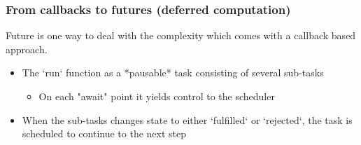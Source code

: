 \begin{frame}[fragile]
    \frametitle{From callbacks to futures (deferred computation)}
% 
% 
Future is one way to deal with the complexity which comes with a callback based approach.
% 
% 
    \begin{itemize}
        \item The `run` function as a *pausable* task consisting of several sub-tasks
    	\begin{itemize}
    	    \item On each "await" point it yields control to the scheduler
    	\end{itemize}
        \item When the sub-tasks changes state to either `fulfilled` or `rejected`, the task is scheduled to continue to the next step
    \end{itemize}

\end{frame}

